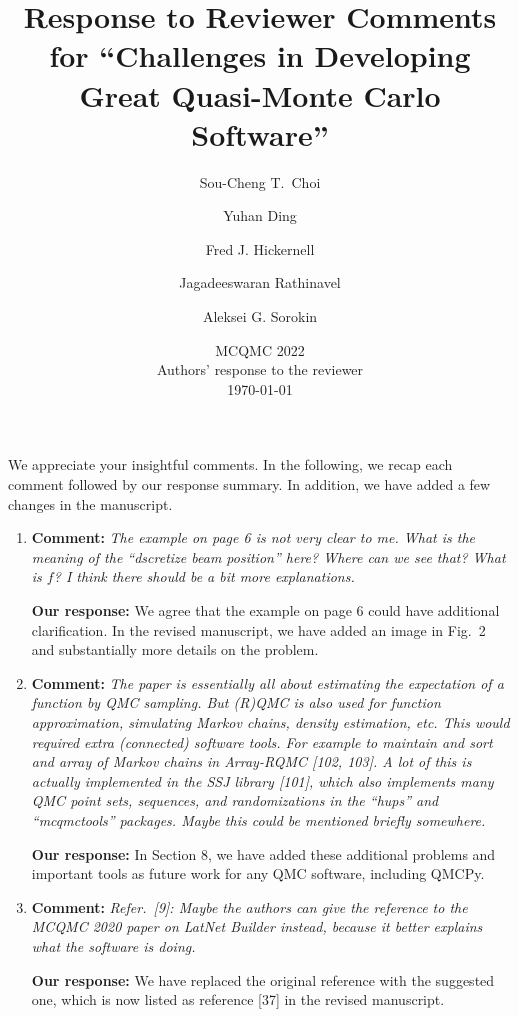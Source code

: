 \documentclass{article}[12pt]
\title{Response to Reviewer Comments for  ``Challenges in Developing Great Quasi-Monte Carlo Software''}
\author{Sou-Cheng T.~Choi \and Yuhan Ding \and Fred J. Hickernell \and Jagadeeswaran  Rathinavel \and Aleksei G. Sorokin}
\date{MCQMC 2022
   \\[1ex]  Authors' response to the reviewer
   \\[1ex] \today}
\begin{document}
\maketitle    

We appreciate your insightful comments.  In the following, we recap each comment followed by our response summary. In addition, we have added a few changes in the manuscript. 

\begin{enumerate}
    \item \textbf{Comment:} \textit{The example on page 6 is not very clear to me. What is the meaning of the ``dscretize
beam position'' here? Where can we see that? What is $f$? I think there should be a
bit more explanations.}

\textbf{Our response:} We agree that the example on page 6 could have additional clarification. In the revised manuscript, we have added an image in Fig.~2 and  substantially more details on the problem. 

    \item \textbf{Comment:} \textit{The paper is essentially all about estimating the expectation of a function by QMC sampling.
But (R)QMC is also used for function approximation, simulating Markov chains,
density estimation, etc. This would required extra (connected) software tools. For example
to maintain and sort and array of Markov chains in Array-RQMC [102, 103].
A lot of this is actually implemented in the SSJ library [101], which also implements
many QMC point sets, sequences, and randomizations in the “hups” and “mcqmctools”
packages. Maybe this could be mentioned briefly somewhere.}

\textbf{Our response:} In Section 8, we have added these additional problems and important tools as future work for any QMC software, including QMCPy.

    \item \textbf{Comment:} \textit{Refer.\ [9]: Maybe the authors can give the reference to the MCQMC 2020 paper on
LatNet Builder instead, because it better explains what the software is doing.}
    
       \textbf{Our response:} We have replaced the original reference with the suggested one, which is now listed as reference [37] in the revised manuscript.
    

\end{enumerate}
\end{document}

